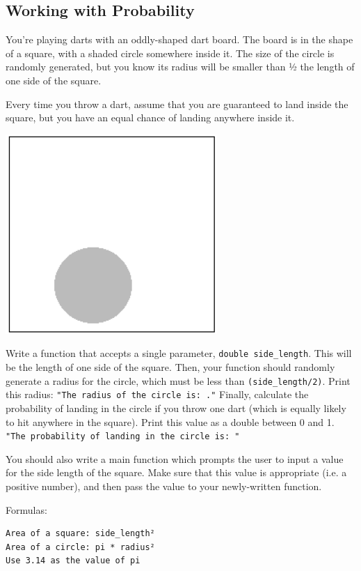 \subsection{Working with Probability}
You’re playing darts with an oddly-shaped dart board. The board is in the shape of a square, with a shaded circle somewhere inside it. The size of the circle is randomly generated, but you know its radius will be smaller than ½ the length of one side of the square.

Every time you throw a dart, assume that you are guaranteed to land inside the square, but you have an equal chance of landing anywhere inside it.

\includegraphics{images/rec12.png}

Write a function that accepts a single parameter, \texttt{double side_length}. This will be the length of one side of the square. Then, your function should randomly generate a radius for the circle, which must be less than \texttt{(side_length/2)}. Print this radius: \texttt{"The radius of the circle is: ."} Finally, calculate the probability of landing in the circle if you throw one dart (which is equally likely to hit anywhere in the square). Print this value as a double between 0 and 1. \texttt{"The probability of landing in the circle is: "}

You should also write a main function which prompts the user to input a value for the side length of the square. Make sure that this value is appropriate (i.e. a positive number), and then pass the value to your newly-written function.

Formulas:

\begin{verbatim}
Area of a square: side_length²
Area of a circle: pi * radius²
Use 3.14 as the value of pi
\end{verbatim}

